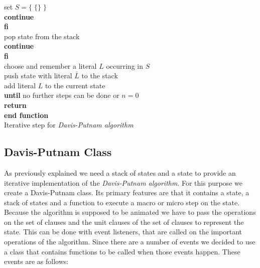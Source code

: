 \begin{listing}[h!]
                    \hspace*{2cm} set $S = \{\;\{\}\;\}$\\
                    \hspace*{2cm} \textbf{continue}\\
                \hspace*{1.5cm} \textbf{fi}\\
                \hspace*{1.5cm} pop state from the stack\\
                \hspace*{1.5cm} \textbf{continue}\\
            \hspace*{1.0cm} \textbf{fi}\\
            \hspace*{1.0cm} choose and remember a literal $L$ occurring in $S$\\
            \hspace*{1.0cm} push state with literal $\bar{L}$ to the stack\\
            \hspace*{1.0cm} add literal $L$ to the current state\\
        \hspace*{0.5cm} \textbf{until} no further steps can be done or $n = 0$\\
        \hspace*{0.5cm} \textbf{return}\\
    \textbf{end function}\\
    \caption{Iterative step for \textit{Davis-Putnam algorithm}}
    \label{code:stepDavisPutnam}
\end{listing}

\subsection{Davis-Putnam Class}
\label{sub:impDavisPutnam}
As previously explained we need a stack of states and a state to provide an iterative implementation of the \textit{Davis-Putnam algorithm}. For this purpose we create a Davis-Putnam class. Its primary features are that it contains a state, a stack of states and a function to execute a macro or micro step on the state. Because the algorithm is supposed to be animated we have to pass the operations on the set of clauses and the unit clauses of the set of clauses to represent the state. This can be done with event listeners, that are called on the important operations of the algorithm. Since there are a number of events we decided to use a class that contains functions to be called when those events happen. These events are as follows:

